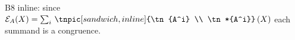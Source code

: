 \documentclass[varwidth=16cm, border=6pt]{standalone}
\begin{document}
B8 inline: since
$\mathcal{E}_A(X)=\sum_{i}\,\tnpic[sandwich, inline]{\tn{A^i} \\ \tn*{A^i}}\,(X)$
each summand is a congruence.
\end{document}
